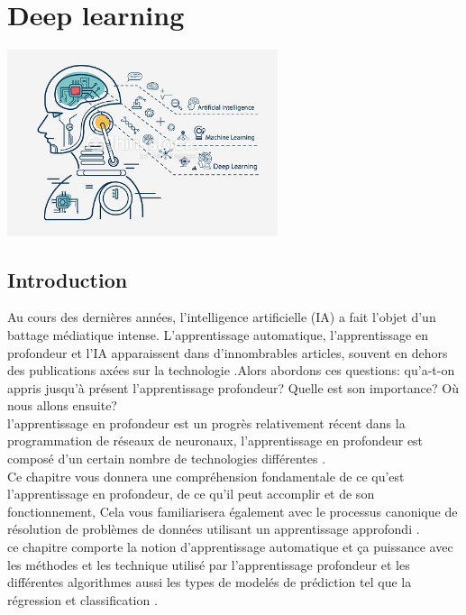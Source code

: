 \documentclass[12pt]{report}
\begin{document}
\chapter{Deep learning}
\begin{center}
\includegraphics[width=300]{1.png} 
\end{center}

\newpage
\section{Introduction}
Au cours des dernières années, l'intelligence artificielle (IA) a fait l'objet d'un battage médiatique intense. L'apprentissage automatique, l'apprentissage en profondeur et l'IA apparaissent dans d'innombrables articles, souvent en dehors des publications axées sur la technologie .Alors abordons ces questions: qu'a-t-on appris jusqu'à présent l'apprentissage profondeur? Quelle est son importance? Où nous allons ensuite?
\\
  l'apprentissage en profondeur est un progrès relativement récent dans la programmation de réseaux de neuronaux, l'apprentissage en profondeur est composé d'un certain nombre de technologies différentes \cite{ref10} .\\
  Ce chapitre vous donnera une compréhension fondamentale de ce qu'est l'apprentissage en profondeur, de ce qu'il peut accomplir et de son fonctionnement, Cela vous familiarisera également avec le processus canonique de résolution de problèmes de données utilisant un apprentissage approfondi \cite{ref10} . 
    \\
  ce chapitre comporte la notion d'apprentissage automatique et ça puissance avec les méthodes et les technique utilisé par l'apprentissage profondeur      
 et les différentes algorithmes aussi les types de modelés de prédiction tel que la régression  et classification \cite{ref10} .
\end{document}
